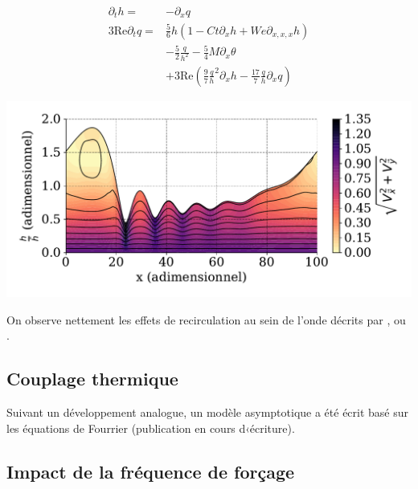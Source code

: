 \documentclass[a0,portrait,11pt]{a0poster}
\begin{document}
\begin{multicols}{2}
\begin{multicols}{2}
    \begin{align*}
        \partial_t h =& -\partial_x q\\
        3 \mathrm{Re} \partial_t q =& \frac{5}{6} h
            \left(
                1 - Ct \partial_x h + We \partial_{x,x,x} h
            \right)\\
        & - \frac{5}{2}\frac{q}{h^2}
        - \frac{5}{4} M \partial_x \theta \\
        & + 3 \mathrm{Re}
            \left(
                \frac{9}{7}\frac{q}{h}^2 \partial_x h - \frac{17}{7}\frac{q}{h} \partial_x q
            \right)
    \end{align*}
    \columnbreak
    \begin{center}\vspace{.5cm}
        \includegraphics[width=0.95\columnwidth]{01-established_wave_streamlines}
        \label{fig:streamlines}
    \end{center}\vspace{.5cm}
\end{multicols}

On observe nettement les effets de recirculation au sein de l'onde décrits par \textcite{Brauner1989}, \textcite{Yoshimura1996} ou \textcite{Miyara1999}.

\subsection*{Couplage thermique}
Suivant un développement analogue, un modèle asymptotique a été écrit basé sur les équations de Fourrier (publication en cours d‹écriture).


\subsection*{Impact de la fréquence de forçage}


\end{multicols}
\end{document}
